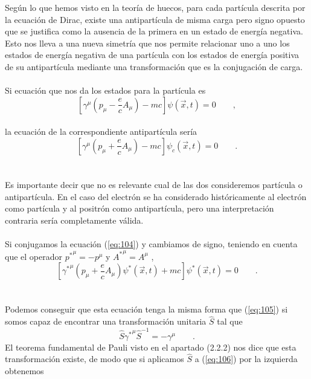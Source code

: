 \documentclass[11pt,letterpaper]{article}     %
\begin{document}
Según lo que hemos visto en la teoría de huecos, para cada partícula descrita por la ecuación de Dirac, existe una antipartícula de misma carga pero signo opuesto que se justifica como la ausencia de la primera en un estado de energía negativa. Esto nos lleva a una nueva simetría que nos permite relacionar uno a uno los estados de energía negativa de una partícula con los estados de energía positiva de su antipartícula mediante una transformación que es la conjugación de carga. \\ \\
Si ecuación que nos da los estados para la partícula es
\begin{equation}\label{eq:105}
\left[\gamma^\mu \left(p_\mu - \frac{e}{c}A_\mu \right)- mc \right] \psi(\vec{x},t)=0 \qquad ,
\end{equation} \\
la ecuación de la correspondiente antipartícula sería
\begin{equation}\label{eq:106}
\left[\gamma^\mu \left(p_\mu + \frac{e}{c}A_\mu \right) - mc \right] \psi_c(\vec{x},t)=0\qquad .
\end{equation} \\ \\
Es importante decir que no es relevante cual de las dos consideremos partícula o antipartícula. En el caso del electrón se ha considerado históricamente al electrón como partícula y al positrón como antipartícula, pero una interpretación contraria sería completamente válida. \\ \\
Si conjugamos la ecuación (\ref{eq:104}) y cambiamos de signo, teniendo en cuenta que el operador ${p^*}^\mu=-p^\mu$ y ${A^*}^\mu=A^\mu$ ,
\begin{equation}\label{eq:107}
\left[ {\gamma^*}^\mu \left(p_\mu + \frac{e}{c}A_\mu \right) \psi^*(\vec{x},t) + mc \right] \psi^*(\vec{x},t)=0 \qquad .
\end{equation} \\ \\
Podemos conseguir que esta ecuación tenga la misma forma que (\ref{eq:105}) si somos capaz de encontrar una transformación unitaria $\hat{S}$ tal que
\begin{equation}\label{eq:108}
\hat{S} {\gamma^*}^\mu \hat{S}^{-1} = -\gamma^\mu \qquad .
\end{equation}
El teorema fundamental de Pauli visto en el apartado (2.2.2) nos dice que esta transformación existe, de modo que si aplicamos $\hat{S}$ a (\ref{eq:106}) por la izquierda obtenemos
\end{document}

